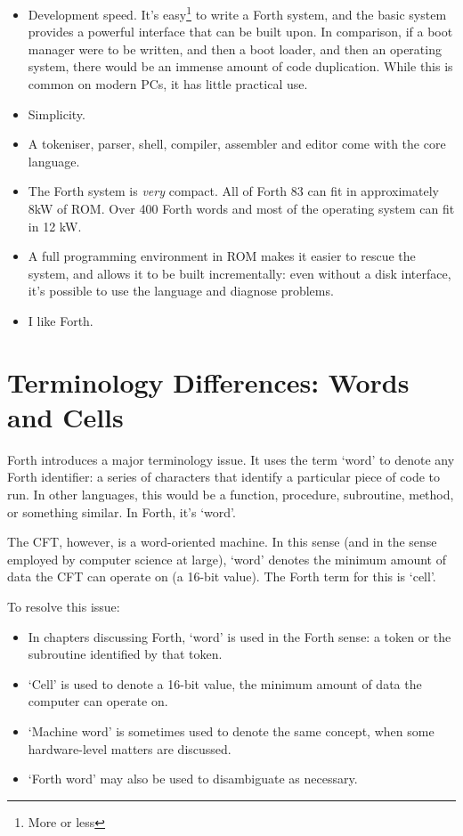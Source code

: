 \begin{itemize}
\item Development speed. It's easy\footnote{More or less} to write a
  Forth system, and the basic system provides a powerful interface
  that can be built upon. In comparison, if a boot manager were to be
  written, and then a boot loader, and then an operating system, there
  would be an immense amount of code duplication. While this is common
  on modern PCs, it has little practical use.

\item Simplicity.

\item A tokeniser, parser, shell, compiler, assembler and editor come
  with the core language.

\item The Forth system is {\em very\/} compact. All of Forth 83 can fit in
  approximately 8kW of ROM. Over 400 Forth words and most of the
  operating system can fit in 12 kW.

\item A full programming environment in ROM makes it easier to rescue
  the system, and allows it to be built incrementally: even without a
  disk interface, it's possible to use the language and diagnose
  problems.

\item I like Forth.

\end{itemize}

\section{Terminology Differences: Words and Cells}

Forth introduces a major terminology issue. It uses the term ‘word’ to denote
any Forth identifier: a series of characters that identify a particular piece
of code to run. In other languages, this would be a function, procedure,
subroutine, method, or something similar. In Forth, it's ‘word’.

The CFT, however, is a word-oriented machine. In this sense (and in the sense
employed by computer science at large), ‘word’ denotes the minimum amount of
data the CFT can operate on (a 16-bit value). The Forth term for this is
‘cell’.

To resolve this issue:

\begin{itemize}
\item In chapters discussing Forth, ‘word’ is used in the Forth sense: a token
  or the subroutine identified by that token.
\item ‘Cell’ is used to denote a 16-bit value, the minimum amount of data the
  computer can operate on.
\item ‘Machine word’ is sometimes used to denote the same concept, when some
  hardware-level matters are discussed.
\item ‘Forth word’ may also be used to disambiguate as necessary.
\end{itemize}

